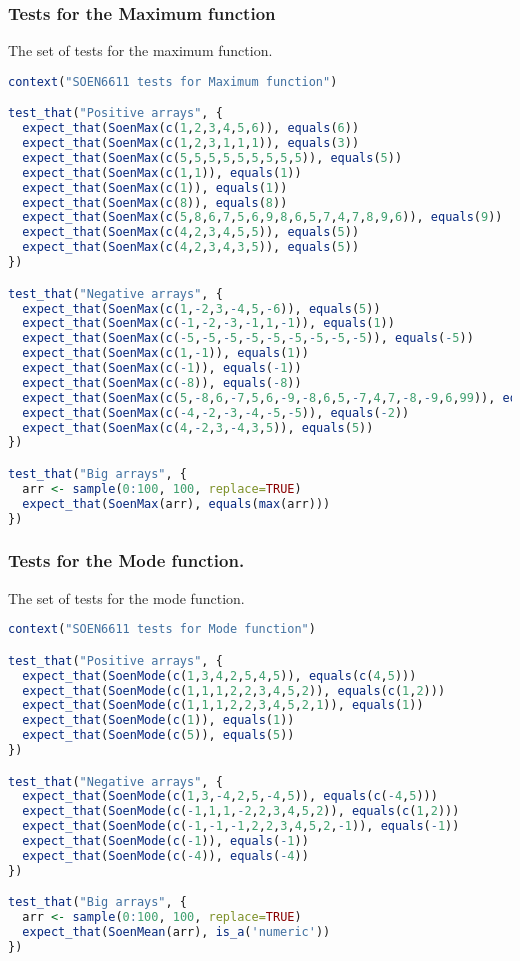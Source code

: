 \documentclass[12pt]{article}
\begin{document}
\subsubsection{Tests for the Maximum function}
The set of tests for the maximum function.
\begin{lstlisting}[language=R]
context("SOEN6611 tests for Maximum function")

test_that("Positive arrays", {
  expect_that(SoenMax(c(1,2,3,4,5,6)), equals(6))
  expect_that(SoenMax(c(1,2,3,1,1,1)), equals(3))
  expect_that(SoenMax(c(5,5,5,5,5,5,5,5,5)), equals(5))
  expect_that(SoenMax(c(1,1)), equals(1))
  expect_that(SoenMax(c(1)), equals(1))
  expect_that(SoenMax(c(8)), equals(8))
  expect_that(SoenMax(c(5,8,6,7,5,6,9,8,6,5,7,4,7,8,9,6)), equals(9))
  expect_that(SoenMax(c(4,2,3,4,5,5)), equals(5))
  expect_that(SoenMax(c(4,2,3,4,3,5)), equals(5))
})

test_that("Negative arrays", {
  expect_that(SoenMax(c(1,-2,3,-4,5,-6)), equals(5))
  expect_that(SoenMax(c(-1,-2,-3,-1,1,-1)), equals(1))
  expect_that(SoenMax(c(-5,-5,-5,-5,-5,-5,-5,-5,-5)), equals(-5))
  expect_that(SoenMax(c(1,-1)), equals(1))
  expect_that(SoenMax(c(-1)), equals(-1))
  expect_that(SoenMax(c(-8)), equals(-8))
  expect_that(SoenMax(c(5,-8,6,-7,5,6,-9,-8,6,5,-7,4,7,-8,-9,6,99)), equals(99))
  expect_that(SoenMax(c(-4,-2,-3,-4,-5,-5)), equals(-2))
  expect_that(SoenMax(c(4,-2,3,-4,3,5)), equals(5))
})

test_that("Big arrays", {
  arr <- sample(0:100, 100, replace=TRUE)
  expect_that(SoenMax(arr), equals(max(arr)))
})
\end{lstlisting}
\subsubsection{Tests for the Mode function.}
The set of tests for the mode function.
\begin{lstlisting}[language=R]
context("SOEN6611 tests for Mode function")

test_that("Positive arrays", {
  expect_that(SoenMode(c(1,3,4,2,5,4,5)), equals(c(4,5)))
  expect_that(SoenMode(c(1,1,1,2,2,3,4,5,2)), equals(c(1,2)))
  expect_that(SoenMode(c(1,1,1,2,2,3,4,5,2,1)), equals(1))
  expect_that(SoenMode(c(1)), equals(1))
  expect_that(SoenMode(c(5)), equals(5))
})

test_that("Negative arrays", {
  expect_that(SoenMode(c(1,3,-4,2,5,-4,5)), equals(c(-4,5)))
  expect_that(SoenMode(c(-1,1,1,-2,2,3,4,5,2)), equals(c(1,2)))
  expect_that(SoenMode(c(-1,-1,-1,2,2,3,4,5,2,-1)), equals(-1))
  expect_that(SoenMode(c(-1)), equals(-1))
  expect_that(SoenMode(c(-4)), equals(-4))
})

test_that("Big arrays", {
  arr <- sample(0:100, 100, replace=TRUE)
  expect_that(SoenMean(arr), is_a('numeric'))
})
\end{lstlisting}
\end{document}
